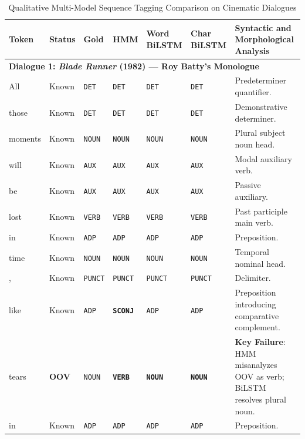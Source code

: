 \documentclass[conference]{IEEEtran}
\begin{document}
\begin{table}[!t]
\caption{Qualitative Multi-Model Sequence Tagging Comparison on Cinematic Dialogues}
\label{tab:qualitative_demo}
\centering
\small
\setlength{\tabcolsep}{4pt}
\begin{tabular*}{\textwidth}{@{\extracolsep{\fill}}llllllp{8.4cm}@{}}
\toprule
\textbf{Token} & \textbf{Status} & \textbf{Gold} & \textbf{HMM} & \textbf{Word BiLSTM} & \textbf{Char BiLSTM} & \textbf{Syntactic and Morphological Analysis} \\
\midrule
\multicolumn{7}{l}{\textbf{Dialogue 1: \textit{Blade Runner} (1982) --- Roy Batty's Monologue}} \\
All       & Known   & \texttt{DET}   & \texttt{DET}   & \texttt{DET}   & \texttt{DET}   & Predeterminer quantifier. \\
those     & Known   & \texttt{DET}   & \texttt{DET}   & \texttt{DET}   & \texttt{DET}   & Demonstrative determiner. \\
moments   & Known   & \texttt{NOUN}  & \texttt{NOUN}  & \texttt{NOUN}  & \texttt{NOUN}  & Plural subject noun head. \\
will      & Known   & \texttt{AUX}   & \texttt{AUX}   & \texttt{AUX}   & \texttt{AUX}   & Modal auxiliary verb. \\
be        & Known   & \texttt{AUX}   & \texttt{AUX}   & \texttt{AUX}   & \texttt{AUX}   & Passive auxiliary. \\
lost      & Known   & \texttt{VERB}  & \texttt{VERB}  & \texttt{VERB}  & \texttt{VERB}  & Past participle main verb. \\
in        & Known   & \texttt{ADP}   & \texttt{ADP}   & \texttt{ADP}   & \texttt{ADP}   & Preposition. \\
time      & Known   & \texttt{NOUN}  & \texttt{NOUN}  & \texttt{NOUN}  & \texttt{NOUN}  & Temporal nominal head. \\
,         & Known   & \texttt{PUNCT} & \texttt{PUNCT} & \texttt{PUNCT} & \texttt{PUNCT} & Delimiter. \\
like      & Known   & \texttt{ADP}   & \textbf{\texttt{SCONJ}} & \texttt{ADP} & \texttt{ADP} & Preposition introducing comparative complement. \\
tears     & \textbf{OOV} & \texttt{NOUN} & \textbf{\texttt{VERB}} & \textbf{\texttt{NOUN}} & \textbf{\texttt{NOUN}} & \textbf{Key Failure}: HMM misanalyzes OOV as verb; BiLSTM resolves plural noun. \\
in        & Known   & \texttt{ADP}   & \texttt{ADP}   & \texttt{ADP}   & \texttt{ADP}   & Preposition. \\

\end{tabular*}
\end{table}
\end{document}
